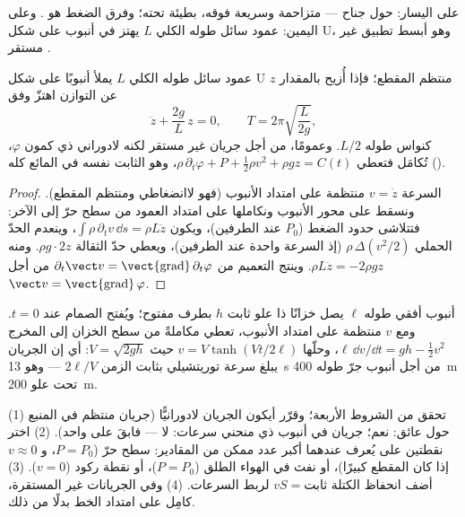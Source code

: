 \begin{omfigure}
{\small على اليسار:  حول جناح --- متزاحمة وسريعة
فوقه، بطيئة تحته؛ وفرق الضغط هو . وعلى اليمين: عمود
سائل طوله الكلي $L$ يهتز في أنبوب على شكل U، وهو أبسط تطبيق غير
مستقر .}
\end{omfigure}

\begin{proposition}\label{prop:b2:euler-bernoulli:utube}
عمود سائل طوله الكلي $L$ يملأ أنبوبًا على شكل U منتظم المقطع؛
فإذا أُزيح بالمقدار $z$ عن التوازن اهتزّ وفق
\[
\ddot z + \frac{2g}{L}\,z = 0 , \qquad T = 2\pi\sqrt{\frac{L}{2g}} ,
\]
كنواس طوله $L/2$. وعمومًا، من أجل جريان غير مستقر لكنه
لادوراني ذي كمون $\varphi$، تُكامَل  فتعطي
$\rho\,\partial_t\varphi + P + \tfrac12\rho v^2 + \rho gz = C(t)$، وهو الثابت
نفسه في المائع كله ().
\end{proposition}

\begin{proof}
السرعة $v = \dot z$ منتظمة على امتداد الأنبوب (فهو لاانضغاطي
ومنتظم المقطع). ونسقط  على محور الأنبوب ونكاملها
على امتداد العمود من سطح حرّ إلى الآخر: فتتلاشى حدود الضغط
($P_0$ عند الطرفين)، ويكون $\int\rho\,\partial_tv\,\dd s = \rho L\ddot z$، وينعدم
الحدّ الحملي $\rho\,\Delta(v^2/2)$ (إذ السرعة واحدة عند الطرفين)،
ويعطي حدّ الثقالة $\rho g\cdot2z$. ومنه $\rho L\ddot z = -2\rho gz$.
وينتج التعميم من $\partial_t\vect v = \operatorname{\vect{grad}}
\partial_t\varphi$ من أجل $\vect v = \operatorname{\vect{grad}}\varphi$.
\end{proof}

\begin{example}\label{ex:b2:euler-bernoulli:start}
أنبوب أفقي طوله $\ell$ يصل خزانًا ذا علو ثابت $h$ بطرف
مفتوح؛ ويُفتح الصمام عند $t = 0$. ومع $v$ منتظمة
على امتداد الأنبوب، تعطي  مكاملةً من سطح الخزان إلى
المخرج $\ell\,\dd v/\dd t = gh - \tfrac12v^2$، وحلّها
$v = V\tanh(Vt/2\ell)$ حيث $V = \sqrt{2gh}$: أي إن الجريان يبلغ سرعة
توريتشيلي بثابت الزمن $2\ell/V$ --- وهو \qty{13}{s} من أجل أنبوب جرّ
طوله \qty{400}{m} تحت علو \qty{200}{m}.
\end{example}

\begin{method}\label{met:b2:euler-bernoulli:method}
(1) تحقق من الشروط الأربعة؛ وقرّر أيكون الجريان لادورانيًّا
(جريان منتظم في المنبع حول عائق: نعم؛ جريان في أنبوب ذي منحني
سرعات: لا --- فابقَ على  واحد). (2) اختر نقطتين
على  يُعرف عندهما أكبر عدد ممكن من المقادير: سطح حرّ
($P = P_0$، و $v \approx 0$ إذا كان المقطع كبيرًا)، أو نفث في الهواء
الطلق ($P = P_0$)، أو نقطة ركود ($v = 0$). (3) أضف انحفاظ
الكتلة $vS = \text{ثابت}$ لربط السرعات. (4) وفي الجريانات غير
المستقرة، كامِل  على امتداد الخط بدلًا من ذلك.
\end{method}

